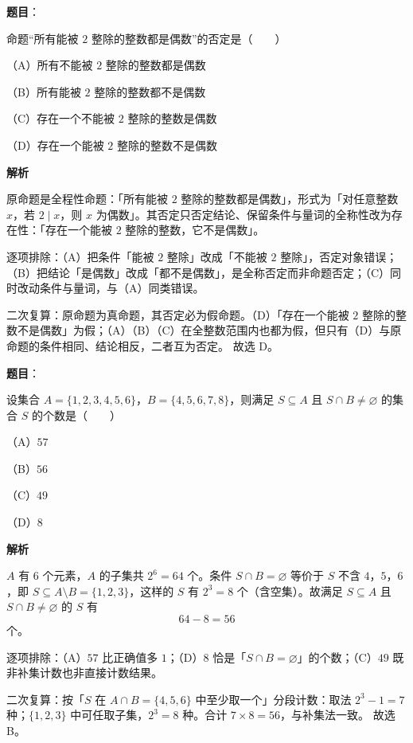 \begin{answer}

\textbf{题目}：

命题“所有能被 $2$ 整除的整数都是偶数”的否定是\mbox{（　　）}

（A）所有不能被 $2$ 整除的整数都是偶数

（B）所有能被 $2$ 整除的整数都不是偶数

（C）存在一个不能被 $2$ 整除的整数是偶数

（D）存在一个能被 $2$ 整除的整数不是偶数

\textbf{解析}

原命题是全程性命题：「所有能被 $2$ 整除的整数都是偶数」，形式为「对任意整数 $x$，若 $2\mid x$，则 $x$ 为偶数」。其否定只否定结论、保留条件与量词的全称性改为存在性：「存在一个能被 $2$ 整除的整数，它不是偶数」。

逐项排除：（A）把条件「能被 $2$ 整除」改成「不能被 $2$ 整除」，否定对象错误；（B）把结论「是偶数」改成「都不是偶数」，是全称否定而非命题否定；（C）同时改动条件与量词，与（A）同类错误。

二次复算：原命题为真命题，其否定必为假命题。（D）「存在一个能被 $2$ 整除的整数不是偶数」为假；（A）（B）（C）在全整数范围内也都为假，但只有（D）与原命题的条件相同、结论相反，二者互为否定。
故选 D。


\end{answer}
\begin{answer}

\textbf{题目}：

设集合 $A=\{1,2,3,4,5,6\}$，$B=\{4,5,6,7,8\}$，则满足 $S\subseteq A$ 且 $S\cap B\neq\varnothing$ 的集合 $S$ 的个数是\mbox{（　　）}

（A）$57$

（B）$56$

（C）$49$

（D）$8$

\textbf{解析}

$A$ 有 $6$ 个元素，$A$ 的子集共 $2^6=64$ 个。条件 $S\cap B=\varnothing$ 等价于 $S$ 不含 $4$，$5$，$6$，即 $S\subseteq A\setminus B=\{1,2,3\}$，这样的 $S$ 有 $2^3=8$ 个（含空集）。故满足 $S\subseteq A$ 且 $S\cap B\neq\varnothing$ 的 $S$ 有
\nopagebreak[4]
\[64-8=56\]
个。

逐项排除：（A）$57$ 比正确值多 $1$；（D）$8$ 恰是「$S\cap B=\varnothing$」的个数；（C）$49$ 既非补集计数也非直接计数结果。

二次复算：按「$S$ 在 $A\cap B=\{4,5,6\}$ 中至少取一个」分段计数：取法 $2^3-1=7$ 种；$\{1,2,3\}$ 中可任取子集，$2^3=8$ 种。合计 $7\times8=56$，与补集法一致。
故选 B。


\end{answer}
